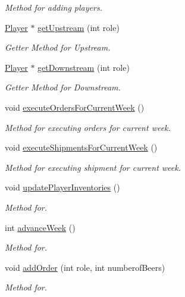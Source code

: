 \begin{DoxyCompactItemize}
\begin{DoxyCompactList}\small\item\em Method for adding players. \end{DoxyCompactList}\item 
\hyperlink{classPlayer}{Player} $\ast$ \hyperlink{classGame_ac055ae02c6ab4a4f2a6099da86b97932}{get\+Upstream} (int role)
\begin{DoxyCompactList}\small\item\em Getter Method for Upstream. \end{DoxyCompactList}\item 
\hyperlink{classPlayer}{Player} $\ast$ \hyperlink{classGame_afd99959acb65696ddab45bdedf7b17fb}{get\+Downstream} (int role)
\begin{DoxyCompactList}\small\item\em Getter Method for Downstream. \end{DoxyCompactList}\item 
void \hyperlink{classGame_a907d3c04b949ddcf3d528a0c45122ba8}{execute\+Orders\+For\+Current\+Week} ()
\begin{DoxyCompactList}\small\item\em Method for executing orders for current week. \end{DoxyCompactList}\item 
void \hyperlink{classGame_ab3dc5ad2b07ebdab4ed710904bb629e8}{execute\+Shipments\+For\+Current\+Week} ()
\begin{DoxyCompactList}\small\item\em Method for executing shipment for current week. \end{DoxyCompactList}\item 
void \hyperlink{classGame_ac586db141ef21c992a6474300bdea2d0}{update\+Player\+Inventories} ()
\begin{DoxyCompactList}\small\item\em Method for. \end{DoxyCompactList}\item 
int \hyperlink{classGame_a8471ea91ed18fc2d289eb23747d11d39}{advance\+Week} ()
\begin{DoxyCompactList}\small\item\em Method for. \end{DoxyCompactList}\item 
void \hyperlink{classGame_a2cfb2422cb425f254c0cb455fefa0fb5}{add\+Order} (int role, int numberof\+Beers)
\begin{DoxyCompactList}\small\item\em Method for. \end{DoxyCompactList}\item 

\end{DoxyCompactItemize}
